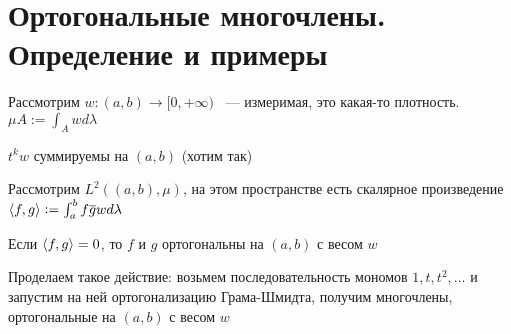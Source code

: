 \section{Ортогональные многочлены. Определение и примеры}

Рассмотрим $w: (a, b) \rightarrow [0, +\infty)$ ~--- измеримая, это какая-то плотность.
 $\mu A := \int_A w d\lambda$
 
 $t^k w$ суммируемы на $(a,b)$ (хотим так)
 
 Рассмотрим $L^2((a, b), \mu)$, на этом пространстве есть скалярное произведение
 $\left\langle f, g \right\rangle := \int_a^b f\overline{g} w d\lambda$
 
 Если $\left\langle f, g \right\rangle = 0$, то $f$ и $g$ ортогональны на $(a, b)$ с весом $w$
 
 Проделаем такое действие: возьмем последовательность мономов $1, t, t^2, \ldots$ и запустим
  на ней ортогонализацию Грама-Шмидта, получим многочлены, ортогональные на $(a, b)$ с весом $w$
  
